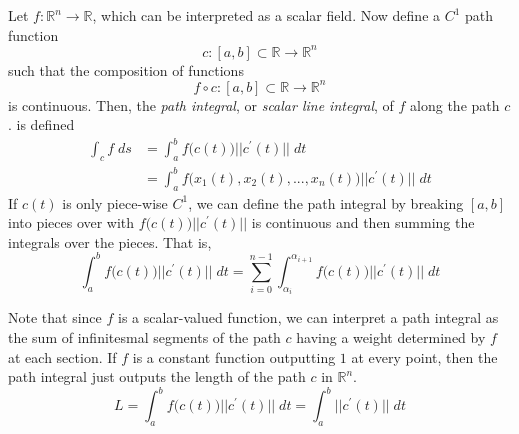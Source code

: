   \begin{definition}
  Let $f: \mathbb{R}^n \longrightarrow \mathbb{R}$, which can be interpreted as a scalar field. Now define a $C^1$ path function 
  \[c: [a,b] \subset \mathbb{R} \longrightarrow \mathbb{R}^n \]
  such that the composition of functions
  \[f \circ c: [a, b] \subset \mathbb{R} \longrightarrow \mathbb{R}^n\]
  is continuous. Then, the \textit{path integral}, or \textit{scalar line integral}, of $f$ along the path $c$. is defined
  \begin{align*}
      \int_c f \;d s & = \int_a^b f\big(c(t)\big) ||c^\prime (t)|| \;d t \\
      & = \int_a^b f\big( x_1 (t), x_2 (t), ..., x_n (t)\big) ||c^\prime (t)|| \; d t
  \end{align*}
  If $c(t)$ is only piece-wise $C^1$, we can define the path integral by breaking $[a,b]$ into pieces over with $f\big( c(t)\big) ||c^\prime (t)||$ is continuous and then summing the integrals over the pieces. 
  That is, 
  \[\int_a^b f\big(c(t)\big) ||c^\prime (t)|| \;d t = \sum_{i = 0}^{n-1} \int_{\alpha_i}^{\alpha_{i+1}} f\big(c(t)\big) ||c^\prime (t)|| \; d t\]
  \end{definition}
  Note that since $f$ is a scalar-valued function, we can interpret a path integral as the sum of infinitesmal segments of the path $c$ having a weight determined by $f$ at each section. 
  If $f$ is a constant function outputting $1$ at every point, then the path integral just outputs the length of the path $c$ in $\mathbb{R}^n$. 
  \[L = \int_a^b f\big( c(t)\big) ||c^\prime (t)|| \; d t = \int_a^b ||c^\prime (t)|| \; d t\]

